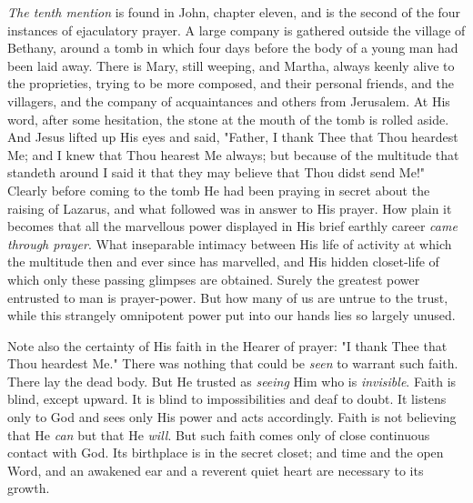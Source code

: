 \textit{The tenth mention} is found in John, chapter eleven, and is the second of
the four instances of ejaculatory prayer. A large company is gathered
outside the village of Bethany, around a tomb in which four days before
the body of a young man had been laid away. There is Mary, still weeping,
and Martha, always keenly alive to the proprieties, trying to be more
composed, and their personal friends, and the villagers, and the company
of acquaintances and others from Jerusalem. At His word, after some
hesitation, the stone at the mouth of the tomb is rolled aside. And Jesus
lifted up His eyes and said, "Father, I thank Thee that Thou heardest Me;
and I knew that Thou hearest Me always; but because of the multitude that
standeth around I said it that they may believe that Thou didst send Me!"
Clearly before coming to the tomb He had been praying in secret about the
raising of Lazarus, and what followed was in answer to His prayer. How
plain it becomes that all the marvellous power displayed in His brief
earthly career \textit{came through prayer}. What inseparable intimacy between
His life of activity at which the multitude then and ever since has
marvelled, and His hidden closet-life of which only these passing glimpses
are obtained. Surely the greatest power entrusted to man is prayer-power.
But how many of us are untrue to the trust, while this strangely
omnipotent power put into our hands lies so largely unused.

Note also the certainty of His faith in the Hearer of prayer: "I thank
Thee that Thou heardest Me." There was nothing that could be \textit{seen} to
warrant such faith. There lay the dead body. But He trusted as \textit{seeing}
Him who is \textit{invisible}. Faith is blind, except upward. It is blind to
impossibilities and deaf to doubt. It listens only to God and sees only
His power and acts accordingly. Faith is not believing that He \textit{can} but
that He \textit{will}. But such faith comes only of close continuous contact with
God. Its birthplace is in the secret closet; and time and the open Word,
and an awakened ear and a reverent quiet heart are necessary to its
growth.

